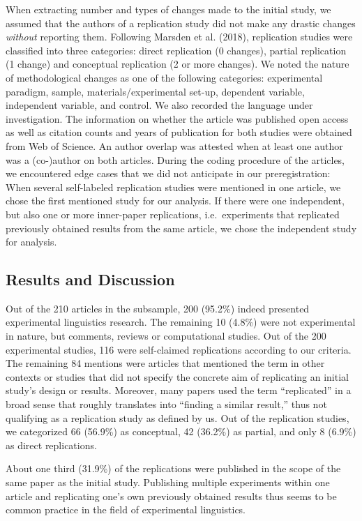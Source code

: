 \documentclass[]{elsarticle} %
\begin{document}
When extracting number and types of changes made to the initial study, we assumed that the authors of a replication study did not make any drastic changes \emph{without} reporting them.
Following Marsden et al. (2018), replication studies were classified into three categories: direct replication (0 changes), partial replication (1 change) and conceptual replication (2 or more changes).
We noted the nature of methodological changes as one of the following categories:
experimental paradigm, sample, materials/experimental set-up, dependent variable, independent variable, and control.
We also recorded the language under investigation.
The information on whether the article was published open access as well as citation counts and years of publication for both studies were obtained from Web of Science.
An author overlap was attested when at least one author was a (co-)author on both articles.
During the coding procedure of the articles, we encountered edge cases that we did not anticipate in our preregistration: When several self-labeled replication studies were mentioned in one article, we chose the first mentioned study for our analysis. If there were one independent, but also one or more inner-paper replications, i.e.~experiments that replicated previously obtained results from the same article, we chose the independent study for analysis.

\hypertarget{results-and-discussion-1}{%
\subsection{Results and Discussion}\label{results-and-discussion-1}}

Out of the 210 articles in the subsample, 200 (95.2\%) indeed presented experimental linguistics research. The remaining 10 (4.8\%) were not experimental in nature, but comments, reviews or computational studies. Out of the 200 experimental studies, 116 were self-claimed replications according to our criteria. The remaining 84 mentions were articles that mentioned the term in other contexts or studies that did not specify the concrete aim of replicating an initial study's design or results. Moreover, many papers used the term ``replicated'' in a broad sense that roughly translates into ``finding a similar result,'' thus not qualifying as a replication study as defined by us.
Out of the replication studies, we categorized 66 (56.9\%) as conceptual, 42 (36.2\%) as partial, and only 8 (6.9\%) as direct replications.

About one third (31.9\%) of the replications were published in the scope of the same paper as the initial study. Publishing multiple experiments within one article and replicating one's own previously obtained results thus seems to be common practice in the field of experimental linguistics.
\end{document}
